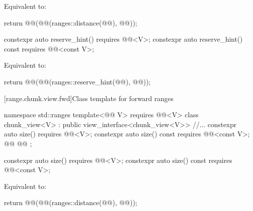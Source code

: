 \documentclass{wg21}
\begin{document}
\begin{itemdescr}
    \pnum
    \effects
    Equivalent to:
    \begin{codeblock}
        return @@(@@(ranges::distance(@@), @@));
    \end{codeblock}
\end{itemdescr}

\begin{addedblock}
\begin{itemdecl}
    constexpr auto reserve_hint() requires @@<V>;
    constexpr auto reserve_hint() const requires @@<const V>;
\end{itemdecl}

\begin{itemdescr}
    \pnum
    \effects
    Equivalent to:
    \begin{codeblock}
        return @@(@@(ranges::reserve_hint(@@), @@));
    \end{codeblock}
\end{itemdescr}
\end{addedblock}

[range.chunk.view.fwd]{Class template  for forward ranges}

%
%
%
\begin{codeblock}
namespace std::ranges {
template<@@ V>
requires @@<V>
class chunk_view<V> : public view_interface<chunk_view<V>> {
   //...
   constexpr auto size() requires @@<V>;
   constexpr auto size() const requires @@<const V>;
   @@
   @@
};
}
\end{codeblock}

\begin{itemdecl}
    constexpr auto size() requires @@<V>;
    constexpr auto size() const requires @@<const V>;
\end{itemdecl}

\begin{itemdescr}
    \pnum
    \effects
    Equivalent to:
    \begin{codeblock}
        return @@(@@(ranges::distance(@@), @@));
    \end{codeblock}
\end{itemdescr}
\end{document}
